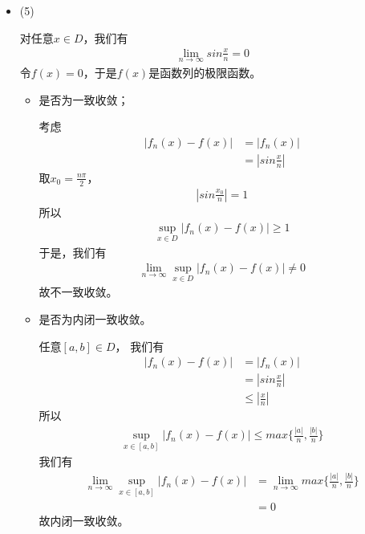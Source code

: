 \documentclass{article}
\begin{document}
\begin{itemize}
  \item (5)

        对任意$x \in D$，我们有
        \begin{align*}
          \lim\limits_{n \to \infty} sin \frac{x}{n} = 0
        \end{align*}
        令$f(x) = 0$，于是$f(x)$是函数列的极限函数。

        \begin{itemize}
          \item 是否为一致收敛；

                考虑
                \begin{align*}
                  |f_n(x) - f(x)|
                   & = |f_n(x)|                     \\
                   & = \left|sin \frac{x}{n}\right|
                \end{align*}
                取$x_0 = \frac{n\pi}{2}$，
                \begin{align*}
                  \left|sin \frac{x_0}{n}\right| = 1
                \end{align*}
                所以
                \begin{align*}
                  \sup\limits_{x \in D} |f_n(x) - f(x)| \geq 1
                \end{align*}
                于是，我们有
                \begin{align*}
                  \lim\limits_{n \to \infty} \sup\limits_{x \in D} |f_n(x) - f(x)| \neq 0
                \end{align*}
                故不一致收敛。

          \item 是否为内闭一致收敛。

                任意$[a, b] \in D$，
                我们有
                \begin{align*}
                  |f_n(x) - f(x)|
                   & = |f_n(x)|                     \\
                   & = \left|sin \frac{x}{n}\right| \\
                   & \leq \left| \frac{x}{n}\right|
                \end{align*}
                所以
                \begin{align*}
                  \sup\limits_{x \in [a, b]} |f_n(x) - f(x)| \leq max\{\frac{|a|}{n},\frac{|b|}{n}\}
                \end{align*}
                我们有
                \begin{align*}
                  \lim\limits_{n \to \infty} \sup\limits_{x \in [a, b]} |f_n(x) - f(x)|
                   & = \lim\limits_{n \to \infty} max\{\frac{|a|}{n},\frac{|b|}{n}\} \\
                   & = 0
                \end{align*}
                故内闭一致收敛。
        \end{itemize}
\end{itemize}
\end{document}
